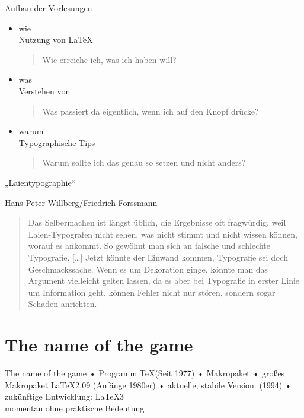 \begin{frame}{Aufbau der Vorlesungen}{}
\begin{itemize}
\item \alert{wie}\\ Nutzung von \LaTeX
\\ \begin{quote}Wie erreiche ich, was ich haben will?\end{quote}
\item \alert{was}\\ Verstehen von \LaTeXTeX
\\ \begin{quote} Was passiert da eigentlich, wenn ich auf den Knopf drücke?\end{quote}
\item \alert{warum}\\ Typographische Tips
\\ \begin{quote}Warum sollte ich das genau so setzen und nicht anders?\end{quote}
\end{itemize}
\end{frame}

\begin{frame}{„Laientypographie“}
\begin{block}{Hans Peter Willberg/Friedrich Forssmann}
\begin{quotation}Das Selbermachen ist längst üblich, die Ergebnisse oft fragwürdig, weil Laien-Typografen nicht sehen, was nicht stimmt und nicht wissen können, worauf es ankommt. So gewöhnt man sich an falsche und schlechte Typografie. [\dots] Jetzt könnte der Einwand kommen, Typografie sei doch Geschmackssache. Wenn es um Dekoration ginge, könnte man das Argument vielleicht gelten lassen, da es aber bei Typografie in erster Linie um Information geht, können Fehler nicht nur stören, sondern sogar Schaden anrichten.
\end{quotation}
\end{block}
\end{frame}

\section{The name of the game}
\begin{frame}[<+->][t]{The name of the game}
• Programm \TeX (Seit 1977)
• Makropaket \plainTeX
{}
• großes Makropaket \LaTeX2.09 (Anfänge 1980er)
• aktuelle, stabile Version: \LaTeXe (1994)
• zukünftige Entwicklung: \LaTeX3 \\ momentan ohne praktische Bedeutung
\•
\end{frame}

